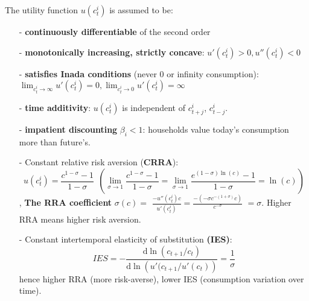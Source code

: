 \documentclass[10pt,landscape,a4paper]{article}
\begin{document}
\begin{multicols*}{3}
\vspace{2pt}

The utility function $u(c_t^i)$ is assumed to be:
\begin{itemize}
    \item[-] \textbf{continuously differentiable} of the second order
    \item[-] \textbf{monotonically increasing, strictly concave}: $u'(c_t^i)>0,u''(c_t^i)<0$
    \item[-] \textbf{satisfies Inada conditions} (never 0 or infinity consumption): $\lim_{c^i_t\rightarrow \infty}u'(c_t^i)=0, \lim_{c^i_t\rightarrow 0}u'(c_t^i)=\infty$
    \item[-] \textbf{time additivity}: $u(c_t^i)$ is independent of $c_{t+j}^i$, $c_{t-j}^i$.
    \item[-] \textbf{impatient discounting} $\beta_i<1$: households value today's consumption more than future's.
    \item[-] Constant relative risk aversion (\textbf{CRRA}): $$u(c_t^i)=\frac{c^{1-\sigma}-1}{1-\sigma}\ \  \left(\lim_{\sigma\rightarrow1}\frac{c^{1-\sigma}-1}{1-\sigma}=\lim_{\sigma\rightarrow1}\frac{e^{(1-\sigma)\ln(c)}-1}{1-\sigma}=\ln(c)\right)$$, 
    \scriptsize
    \textbf{The RRA coefficient} $\sigma(c)=$
    \tiny
    $\frac{-u''(c_t^i)c}{u'(c_t^i)}=\frac{-\left(-\sigma c^{-(1+\sigma)}c\right)}{c^{-\sigma}}$
    \scriptsize
    $=\sigma$. Higher RRA means higher risk aversion. 
    \item[-] Constant intertemporal elasticity of substitution \textbf{(IES)}: $$IES=-\frac{\mathrm{d}\ln\left(c_{t+1}/c_t\right)}{\mathrm{d}\ln\left(u'(c_{t+1}/u'(c_t)\right)}=\frac{1}{\sigma}$$
    hence higher RRA (more risk-averse), lower IES (consumption variation over time).
\end{itemize}


\end{multicols*}
\end{document}
